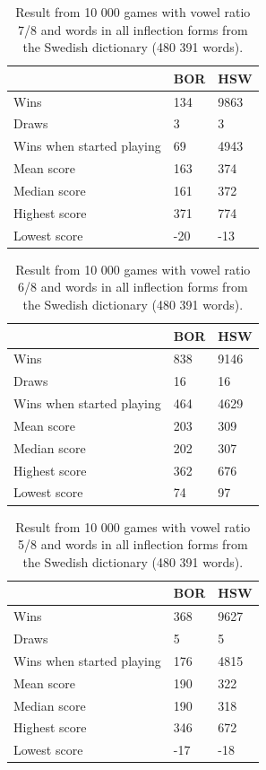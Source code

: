 \documentclass[a4paper, 12pt]{report}
\begin{document}
\begin{table}[h]
\centering
    \begin{tabular}{ l | l | l }
   	& BOR & HSW \\
   	\hline
   	Wins & 134 & 9863 \\
	Draws & 3  & 3 \\
	Wins when started playing & 69 & 4943 \\   	
	Mean score & 163 & 374 \\
	Median score & 161 & 372 \\	 	 
	Highest score & 371 & 774 \\
	Lowest score & -20 & -13 \\		
    \end{tabular}
\caption{Result from 10 000 games with vowel ratio 7/8 and words in all inflection forms from the Swedish dictionary (480 391 words).}
\label{tab:borhswstats7}
\end{table}

\begin{table}[h]
\centering
    \begin{tabular}{ l | l | l }
   	& BOR & HSW \\
   	\hline
   	Wins & 838 & 9146 \\
	Draws & 16  & 16 \\
	Wins when started playing & 464 & 4629 \\   	
	Mean score & 203 & 309 \\
	Median score & 202 & 307 \\	 	 
	Highest score & 362 & 676\\
	Lowest score & 74 & 97 \\		
    \end{tabular}
\caption{Result from 10 000 games with vowel ratio 6/8 and words in all inflection forms from the Swedish dictionary (480 391 words).}
\label{tab:borhswstats6}
\end{table}

\begin{table}[h]
\centering
    \begin{tabular}{ l | l | l }
   	& BOR & HSW \\
   	\hline
   	Wins & 368 & 9627 \\
	Draws & 5 & 5 \\
	Wins when started playing & 176 & 4815 \\   	
	Mean score & 190 & 322 \\
	Median score & 190 & 318 \\	 	 
	Highest score & 346 & 672 \\
	Lowest score & -17 & -18\\		
    \end{tabular}
\caption{Result from 10 000 games with vowel ratio 5/8 and words in all inflection forms from the Swedish dictionary (480 391 words).}
\label{tab:borhswstats5}
\end{table}
\end{document}
